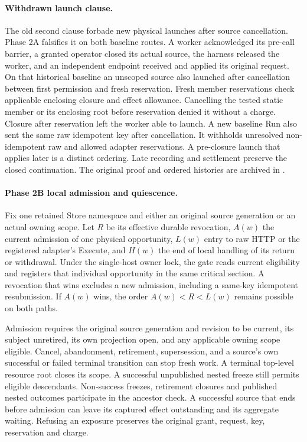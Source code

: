 \documentclass[11pt,a4paper]{article}
\theoremstyle{definition}
\theoremstyle{remark}
\begin{document}
\paragraph{Withdrawn launch clause.}
The old second clause forbade new physical launches after source cancellation. Phase 2A falsifies it on both baseline routes. A worker acknowledged its pre-call barrier, a granted operator closed its actual source, the harness released the worker, and an independent endpoint received and applied its original request. On that historical baseline an unscoped source also launched after cancellation between first permission and fresh reservation. Fresh member reservations check applicable enclosing closure and effect allowance. Cancelling the tested static member or its enclosing root before reservation denied it without a charge. Closure after reservation left the worker able to launch. A new baseline Run also sent the same raw idempotent key after cancellation. It withholds unresolved non-idempotent raw and allowed adapter reservations. A pre-closure launch that applies later is a distinct ordering. Late recording and settlement preserve the closed continuation. The original proof and ordered histories are archived in .

\paragraph{Phase 2B local admission and quiescence.} Fix one retained Store namespace and either an original source generation or an actual owning scope. Let $R$ be its effective durable revocation, $A(w)$ the current admission of one physical opportunity, $L(w)$ entry to raw HTTP or the registered adapter's Execute, and $H(w)$ the end of local handling of its return or withdrawal. Under the single-host owner lock, the gate reads current eligibility and registers that individual opportunity in the same critical section. A revocation that wins excludes a new admission, including a same-key idempotent resubmission. If $A(w)$ wins, the order $A(w)<R<L(w)$ remains possible on both paths.

Admission requires the original source generation and revision to be current, its subject unretired, its own projection open, and any applicable owning scope eligible. Cancel, abandonment, retirement, supersession, and a source's own successful or failed terminal transition can stop fresh work. A terminal top-level resource root closes its scope. A successful unpublished nested freeze still permits eligible descendants. Non-success freezes, retirement closures and published nested outcomes participate in the ancestor check. A successful source that ends before admission can leave its captured effect outstanding and its aggregate waiting. Refusing an exposure preserves the original grant, request, key, reservation and charge.
\end{document}
